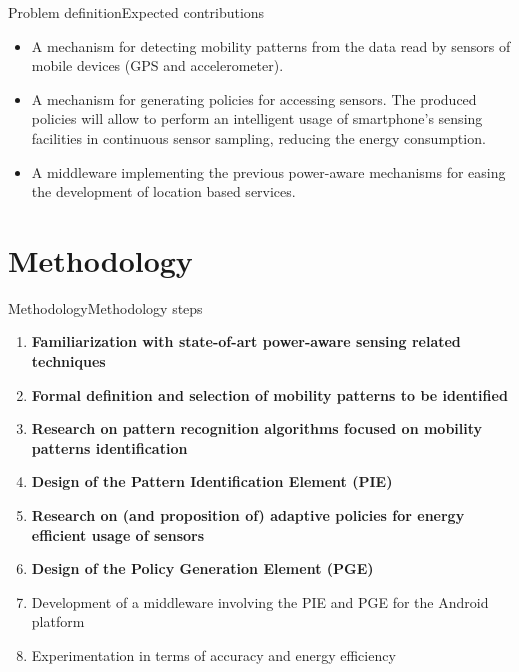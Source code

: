 \documentclass[9pt,xcolor={dvipsnames},handout]{beamer}
\begin{document}
\begin{frame}{Problem definition}{Expected contributions}
\begin{itemize}
  \item<+-> A mechanism for detecting mobility patterns from the data read by sensors of mobile devices (GPS and accelerometer).
  \item<+-> A mechanism for generating policies for accessing sensors.
  The produced policies will allow to perform an intelligent usage of smartphone's sensing facilities in continuous sensor sampling, reducing the energy consumption.
  \item<+-> A middleware implementing the previous power-aware mechanisms for easing the development of location based services.
\end{itemize}
\end{frame}

\section{Methodology}
\begin{frame}{Methodology}{Methodology steps}
\begin{enumerate}
  \item \textbf{Familiarization with state-of-art power-aware sensing related techniques}
  \item \textbf{Formal definition and selection of mobility patterns to be identified}
  \item \textbf{Research on pattern recognition algorithms focused on mobility patterns identification}
  \item \textbf{Design of the Pattern Identification Element (PIE)}
  \item \textbf{Research on (and proposition of) adaptive policies for energy efficient usage of sensors}
  \item \textbf{Design of the Policy Generation Element (PGE)}
  \item Development of a middleware involving the PIE and PGE for the Android platform
  \item Experimentation in terms of accuracy and energy efficiency
\end{enumerate}
\end{frame}
\end{document}
